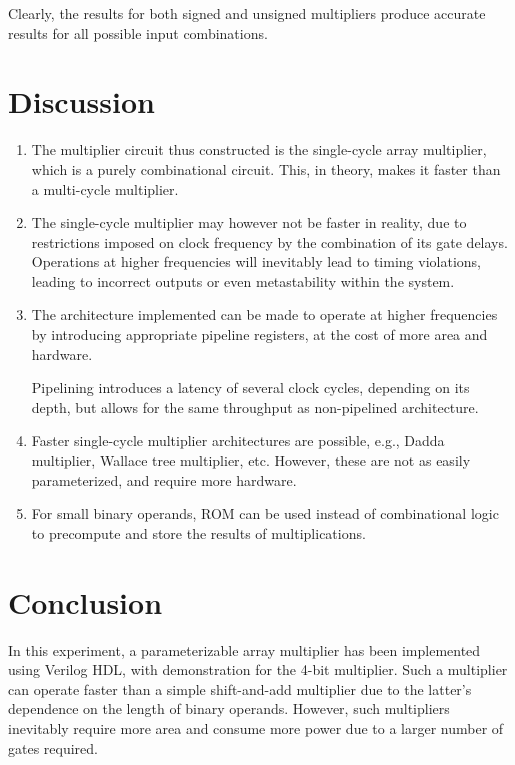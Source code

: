\documentclass[12pt, titlepage]{report}
\begin{document}
Clearly, the results for both signed and unsigned multipliers produce accurate results for all possible input combinations.

\section{Discussion}

\begin{enumerate}
    \item The multiplier circuit thus constructed is the single-cycle array multiplier, which is a purely combinational circuit. This, in theory, makes it faster than a multi-cycle multiplier.
    \item The single-cycle multiplier may however not be faster in reality, due to restrictions imposed on clock frequency by the combination of its gate delays. Operations at higher frequencies will inevitably lead to timing violations, leading to incorrect outputs or even metastability within the system.
    \item The architecture implemented can be made to operate at higher frequencies by introducing appropriate pipeline registers, at the cost of more area and hardware.
    
    Pipelining introduces a latency of several clock cycles, depending on its depth, but allows for the same throughput as non-pipelined architecture.
    \item Faster single-cycle multiplier architectures are possible, e.g., Dadda multiplier, Wallace tree multiplier, etc. However, these are not as easily parameterized, and require more hardware.
    \item For small binary operands, ROM can be used instead of combinational logic to precompute and store the results of multiplications.
\end{enumerate}

\section{Conclusion}

In this experiment, a parameterizable array multiplier has been implemented using Verilog HDL, with demonstration for the 4-bit multiplier. Such a multiplier can operate faster than a simple shift-and-add multiplier due to the latter's dependence on the length of binary operands. However, such multipliers inevitably require more area and consume more power due to a larger number of gates required.
\end{document}
